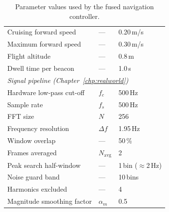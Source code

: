 \begin{table}[h]
\begin{tabular}{lll}
        Cruising forward speed & --- & 0.20\,m/s \\
        Maximum forward speed & --- & 0.30\,m/s \\
        Flight altitude & --- & 0.8\,m \\
        Dwell time per beacon & --- & 1.0\,s \\
        \multicolumn{3}{l}{\textit{Signal pipeline (Chapter~\ref{chp:realworld})}} \\
        Hardware low-pass cut-off & $f_c$ & 500\,Hz \\
        Sample rate & $f_s$ & 500\,Hz \\
        FFT size & $N$ & 256 \\
        Frequency resolution & $\Delta f$ & 1.95\,Hz \\
        Window overlap & --- & 50\,\% \\
        Frames averaged & $N_{\text{avg}}$ & 2 \\
        Peak search half-window & --- & 1\,bin ($\approx$2\,Hz) \\
        Noise guard band & --- & 10\,bins \\
        Harmonics excluded & --- & 4 \\
        Magnitude smoothing factor & $\alpha_m$ & 0.5 \\
        \hline
    \end{tabular}
    \caption{Parameter values used by the fused navigation controller.}
    \label{tab:parameters}
\end{table}

